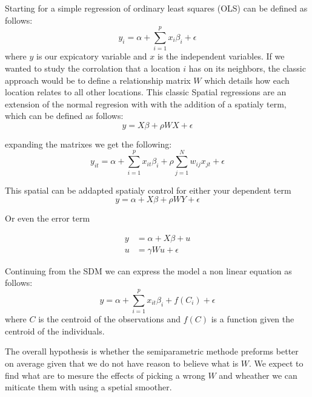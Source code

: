 \documentclass{article}
\begin{document}
Starting for a simple regression of ordinary least squares (OLS) can be defined as follows:
\begin{equation}
	y_i = \alpha + \sum^p_{i=1} x_i \beta_i + \epsilon
	\label{eq:OLS}
\end{equation}
where $y$ is our expicatory variable and $x$ is the independent variables. If we wanted to study the corrolation that a location $i$ has on its neighbors, the classic approach would be
to define a relationship matrix $W$ which details how each location relates to all other locations. This classic Spatial regressions are an extension of the normal regresion with with
the addition of a spatialy term, which can be defined as follows:
\begin{equation}
	y = X \beta + \rho W X + \epsilon
	\label{eq:SDM}
\end{equation}

expanding the matrixes we get the following:
\begin{equation}
	y_{it} = \alpha + \sum^p_{i=1} x_{it} \beta_i + \rho \sum^N_{j=1} w_{ij} x_{jt} +\epsilon
	\label{eq:SDM_exp}
\end{equation}

This spatial can be addapted spatialy control for either your dependent term
\begin{equation}
	y = \alpha + X \beta + \rho W Y + \epsilon
	\label{eq:SAR}
\end{equation}

Or even the error term

\begin{equation}
	\begin{split}
		y & =\alpha + X \beta + u  \\
		u & =\gamma W u + \epsilon
	\end{split}
	\label{eq:SEM}
\end{equation}

Continuing from the SDM we can express the model a non linear equation as follows:
\begin{equation}
	y = \alpha + \sum^p_{i=1} x_{it} \beta_i + f(C_i) + \epsilon
	\label{eq:tensor}
\end{equation}
where $C$ is the centroid of the observations and $f(C)$ is a function given the centroid of the individuals.



The overall hypothesis is whether the semiparametric methode preforms better
on average given that we do not have reason to believe what is $W$. We expect to find what are to mesure the effects of picking a wrong $W$
and wheather we can miticate them with using a spetial smoother.
\end{document}
